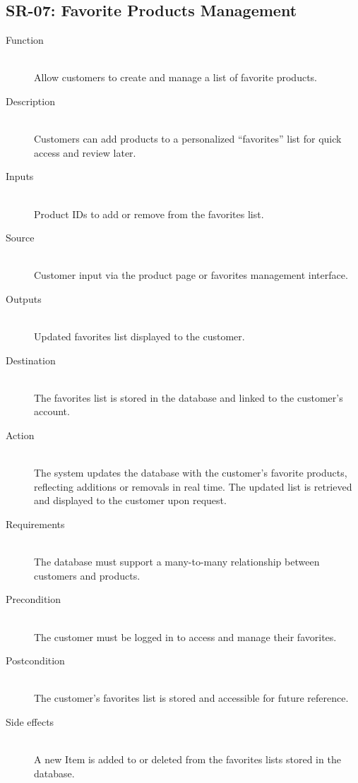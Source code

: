 \documentclass[twoside,a4paper,journal]{IEEEtran}
\begin{document}
\subsection{SR-07: Favorite Products Management}
\begin{description}
  \item[Function] \hfill \\
  Allow customers to
  create and manage a list of favorite products.
  \item[Description] \hfill \\
  Customers can add products to a personalized
  ``favorites'' list for quick access and review later.
  \item[Inputs] \hfill \\
  Product IDs to add or remove from the favorites list.
  \item[Source] \hfill \\
  Customer input via the product page or favorites
  management interface.
  \item[Outputs] \hfill \\
  Updated favorites list displayed to the customer.
  \item[Destination] \hfill \\
  The favorites list is stored in the database and
  linked to the customer's account.
  \item[Action] \hfill \\
  The system updates the database with the customer's
  favorite products, reflecting additions or removals in real time. The updated
  list is retrieved and displayed to the customer upon request.
  \item[Requirements] \hfill \\
  The database must support a many-to-many relationship
  between customers and products.
  \item[Precondition] \hfill \\
  The customer must be logged in to access and manage
  their favorites.
  \item[Postcondition] \hfill \\
  The customer's favorites list is stored and
  accessible for future reference.
  \item[Side effects] \hfill \\
  A new Item is added to or deleted from the favorites
  lists stored in the database.
\end{description}
\end{document}
